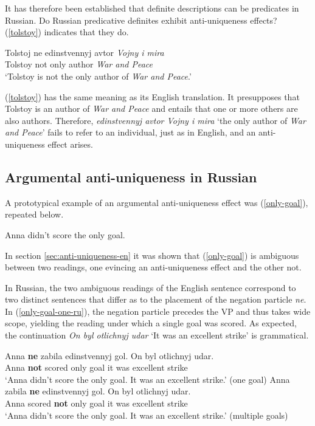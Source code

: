 \documentclass{article}
\begin{document}
It has therefore been established that definite descriptions can be predicates in Russian. Do Russian predicative definites exhibit anti-uniqueness effects? (\ref{tolstoy}) indicates that they do.

\begin{exe}
	\ex \label{tolstoy} \gll Tolstoj ne edinstvennyj avtor \textit{Vojny i mira}\\
	Tolstoy not only author \textit{War and Peace}\\
	\glt `Tolstoy is not the only author of \textit{War and Peace}.'
\end{exe}

(\ref{tolstoy}) has the same meaning as its English translation. It presupposes that Tolstoy is an author of \textit{War and Peace} and entails that one or more others are also authors. Therefore, \textit{edinstvennyj avtor Vojny i mira} `the only author of \textit{War and Peace}' fails to refer to an individual, just as in English, and an anti-uniqueness effect arises.

\subsection{Argumental anti-uniqueness in Russian}
A prototypical example of an argumental anti-uniqueness effect was (\ref{only-goal}), repeated below.

\begin{exe}
	\ex Anna didn't score the only goal.
\end{exe}

In section \ref{sec:anti-uniqueness-en} it was shown that (\ref{only-goal}) is ambiguous between two readings, one evincing an anti-uniqueness effect and the other not.

In Russian, the two ambiguous readings of the English sentence correspond to two distinct sentences that differ as to the placement of the negation particle \textit{ne}. In (\ref{only-goal-one-ru}), the negation particle precedes the VP and thus takes wide scope, yielding the reading under which a single goal was scored. As expected, the continuation \textit{On byl otlichnyj udar} `It was an excellent strike' is grammatical.

\begin{exe}
	\ex \label{only-goal-one-ru} \gll Anna \textbf{ne} zabila edinstvennyj gol. On byl otlichnyj udar.\\
	Anna \textbf{not} scored only goal it was excellent strike\\
	\glt `Anna didn't score the only goal. It was an excellent strike.' (one goal)
	\ex \label{only-goal-multiple-ru} \gll Anna zabila \textbf{ne} edinstvennyj gol. On byl otlichnyj udar.\\
	Anna scored \textbf{not} only goal it was excellent strike\\
	\glt `Anna didn't score the only goal. It was an excellent strike.' (multiple goals)
\end{exe}
\end{document}
